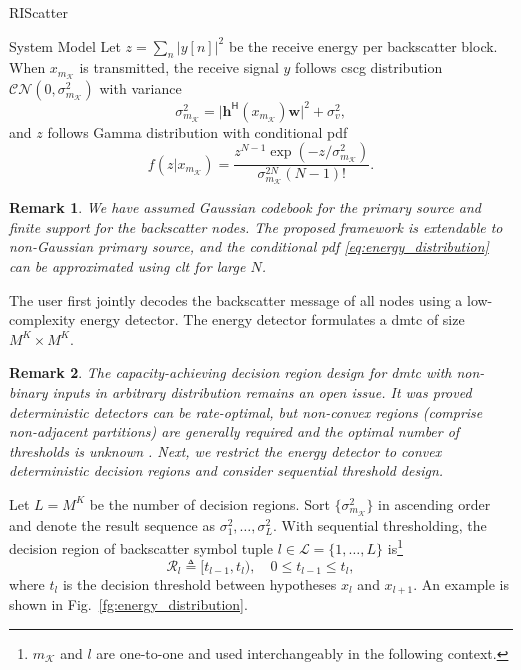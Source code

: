\documentclass[journal]{IEEEtran}
\newtheorem{remark}{Remark}
\begin{document}
\begin{section}{RIScatter}
\begin{subsection}{System Model}
		Let $z=\sum_{n} \bigl\lvert y[n] \bigr\rvert^2$ be the receive energy per backscatter block.
		When $x_{m_\mathcal{K}}$ is transmitted, the receive signal $y$ follows \gls{cscg} distribution $\mathcal{CN}(0,\sigma_{m_{\mathcal{K}}}^2)$ with variance
		\begin{equation}
			\sigma_{m_{\mathcal{K}}}^2 = \lvert \boldsymbol{h}^\mathsf{H}(x_{m_{\mathcal{K}}}) \boldsymbol{w} \rvert^2 + \sigma_v^2,
			\label{eq:receive_variance}
		\end{equation}
		and $z$ follows Gamma distribution with conditional \gls{pdf}
		\begin{equation}
			f(z|x_{m_{\mathcal{K}}}) = \frac{z^{N-1} \exp(-z/\sigma_{m_{\mathcal{K}}}^2)}{\sigma_{m_{\mathcal{K}}}^{2N} (N-1)!}.
			\label{eq:energy_distribution}
		\end{equation}

		\begin{remark}
			We have assumed Gaussian codebook for the primary source and finite support for the backscatter nodes.
			The proposed framework is extendable to non-Gaussian primary source, and the conditional \gls{pdf} \eqref{eq:energy_distribution} can be approximated using \gls{clt} for large $N$.
		\end{remark}

		The user first jointly decodes the backscatter message of all nodes using a low-complexity energy detector.
		The energy detector formulates a \gls{dmtc} of size $M^K \times M^K$.

		\begin{remark}
			The capacity-achieving decision region design for \gls{dmtc} with non-binary inputs in arbitrary distribution remains an open issue.
			It was proved deterministic detectors can be rate-optimal, but non-convex regions (comprise non-adjacent partitions) are generally required and the optimal number of thresholds is unknown \cite{Nguyen2018,Nguyen2021}.
			Next, we restrict the energy detector to convex deterministic decision regions and consider sequential threshold design.
		\end{remark}

		Let $L = M^K$ be the number of decision regions.
		Sort $\{\sigma_{m_{\mathcal{K}}}^2\}$ in ascending order and denote the result sequence as $\sigma_1^2,\ldots,\sigma_L^2$.
		With sequential thresholding, the decision region of backscatter symbol tuple $l \in \mathcal{L} = \{1,\ldots,L\}$ is\footnote{$m_{\mathcal{K}}$ and $l$ are one-to-one and used interchangeably in the following context.}
		\begin{equation}
			\mathcal{R}_{l} \triangleq [t_{l-1},t_l), \quad 0 \le t_{l-1} \le t_l,
		\end{equation}
		where $t_l$ is the decision threshold between hypotheses $x_{l}$ and $x_{l+1}$.
		An example is shown in Fig.~\ref{fg:energy_distribution}.


\end{subsection}
\end{section}
\end{document}
